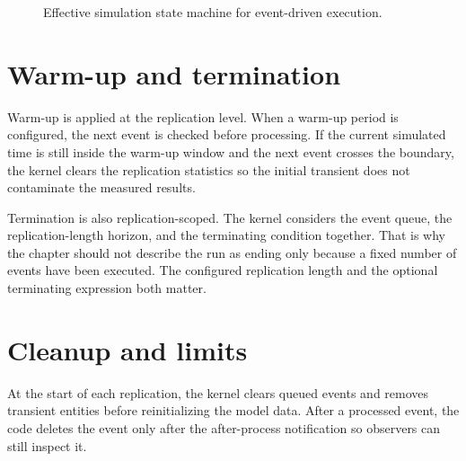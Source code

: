 \begin{figure}[htbp]
\centering
\caption{Effective simulation state machine for event-driven execution.}
\label{fig:event-scheduling-state-machine}
\end{figure}

\section{Warm-up and termination}
\label{sec:event-scheduling-warmup-termination}

Warm-up is applied at the replication level. When a warm-up period is
configured, the next event is checked before processing. If the current
simulated time is still inside the warm-up window and the next event crosses
the boundary, the kernel clears the replication statistics so the initial
transient does not contaminate the measured results.

Termination is also replication-scoped. The kernel considers the event queue,
the replication-length horizon, and the terminating condition together. That is
why the chapter should not describe the run as ending only because a fixed
number of events have been executed. The configured replication length and the
optional terminating expression both matter.

\section{Cleanup and limits}
\label{sec:event-scheduling-cleanup-limits}

At the start of each replication, the kernel clears queued events and removes
transient entities before reinitializing the model data. After a processed
event, the code deletes the event only after the after-process notification so
observers can still inspect it.


